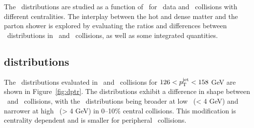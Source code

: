 
The \Dptr\ distributions are studied as a function of \ptjet\ for \pp\ data and \PbPb\ collisions with different centralities.
The interplay between the hot and dense matter and the parton shower is explored by evaluating the ratios and differences between \Dptr\ distributions in \pbpb\ and \pp\ collisions, as well as some integrated quantities.



\subsection{\Dptr distributions}
\label{sec:dptr}
The \Dptr\ distributions evaluated in \pp\ and \pbpb\ collisions for $126 < \mbox{$p_{\mathrm{T}}^{\mathrm{jet}}$} < 158$ GeV are shown in Figure~\ref{fig:dptr}.
The distributions exhibit a difference in shape between \PbPb\ and \pp\ collisions, with the \pbpb\ distributions being broader at low \pt\ (\pt < 4 GeV) and narrower at high \pt\ (\pt > 4 GeV) in \mbox{0--10\%} central collisions.
This modification is centrality dependent and is smaller for peripheral \pbpb\ collisions.


